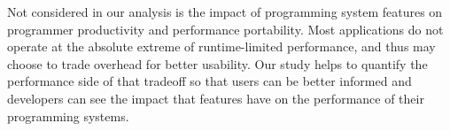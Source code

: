 Not considered in our analysis is the impact of programming system
features on programmer productivity and performance portability. Most
applications do not operate at the absolute extreme of runtime-limited
performance, and thus may choose to trade overhead for better
usability. Our study helps to quantify the performance side of that
tradeoff so that users can be better informed and developers can see
the impact that features have on the performance of their programming
systems.
